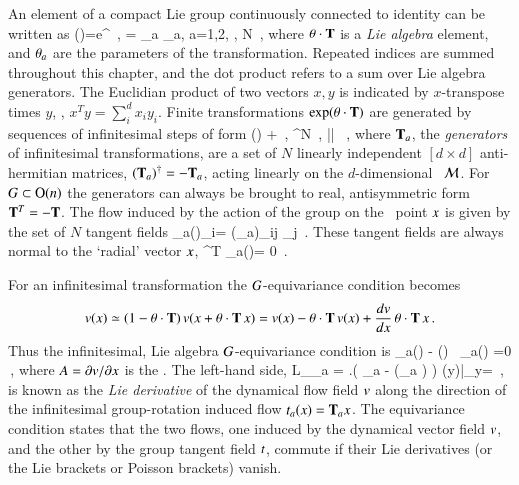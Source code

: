 \documentclass[final,number,sort&compress]{elsarticle}
\begin{document}
An element of a compact Lie group
continuously connected to identity can be written as
\beq
\LieEl(\gSpace)=e^{\gSpace \cdot \Lg }
	\,,\qquad
\gSpace \cdot \Lg  = \sum \gSpace_a \Lg_a,\; a=1,2, \cdots, N
\,,
where
$\gSpace \cdot \Lg$
is a {\em Lie algebra} element,  and $\gSpace_a$ are the parameters
of the transformation. Repeated indices are summed throughout this
chapter, and the dot product refers to a sum over
Lie algebra generators. The Euclidian product of two vectors
$x,y$ is indicated by $x$-transpose times $y$, \ie,
$x^T y = \sum_i^d x_i y_i$.
Finite transformations $ \exp(\gSpace \cdot {\Lg}) $ are
generated by sequences of infinitesimal steps of form
\beq
\LieEl(\delta\gSpace)  + \delta \gSpace \cdot \Lg
    \,,\quad
\delta\gSpace \in \reals^N
    \,,\quad
|\delta \gSpace| 
    \, ,
where $\Lg_a$, the {\em generators} of infinitesimal
transformations, are a set of $N$ linearly independent
$[d\!\times\!d]$ anti-hermitian matrices, $(\Lg_a)^\dagger =
- \Lg_a$, acting linearly on the $d$-dim\-ens\-ion\-al \statesp\
$\pS$.
For $\Group \subset \On{n}$ the generators can
always be brought to real, antisymmetric form
$\Lg^T=-\Lg$.
The flow induced by the action of the group
on the \statesp\ point $\ssp$ 
is given by the set of $N$ tangent fields
\beq
\groupTan_a(\ssp)_{i}= (\Lg_a){}_{ij} \ssp_j
\,.
These tangent fields are always normal to the
`radial' vector $\ssp$,
\beq
\ssp^T \groupTan_a(\ssp)= 0
\,.

For an infinitesimal transformation 
the $\Group$-equivariance condition 
becomes
\[
\vel(\ssp)
      \simeq
  (1-\gSpace \cdot \Lg) \, \vel(\ssp+\gSpace \cdot \Lg \, \ssp)
       = \vel(\ssp)- \gSpace \cdot \Lg \, \vel(\ssp)
             + \frac{d\vel}{d\ssp} \,\gSpace \cdot \Lg \, \ssp
\,.
\]
Thus the
infinitesimal, Lie algebra $G$-equivariance condition is
\beq
  \groupTan_a(\vel)  - \Mvar(\ssp) \, \groupTan_a(\ssp) =0
  \,,
where $A = {\partial v}/{\partial x}$ is the \stabmat.
The left-hand side,
\beq
{\cal L}_{\groupTan_a} \vel =
\left.\left(
  \Lg_a - (\Lg_a \ssp)
 \right) \vel(y)\right|_{y=\ssp}
 \,,
is known as
the {\em Lie derivative} of the dynamical flow
field $v$ along the direction of the infinitesimal
group-rotation induced flow $t_a(x)= \mathbf{T}_a x$.
The equivariance condition  states that the two
flows, one induced by the dynamical vector field $v$, and
the other by the group tangent field $t$, commute if
their Lie derivatives (or the Lie brackets or Poisson
brackets) vanish.
\end{document}
